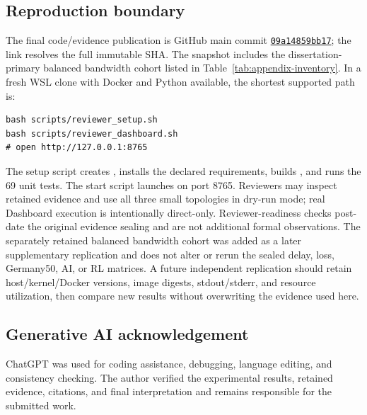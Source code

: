 \subsection{Reproduction boundary}
\label{sec:reviewer-reproduction}

The final code/evidence publication is GitHub main commit \href{https://github.com/Mochi486/Digital-Twin/tree/09a14859bb17e36d892c2145e129128525687229}{\texttt{09a14859bb17}}; the link resolves the full immutable SHA. The snapshot includes the dissertation-primary balanced bandwidth cohort listed in Table~\ref{tab:appendix-inventory}. In a fresh WSL clone with Docker and Python available, the shortest supported path is:

\begin{verbatim}
bash scripts/reviewer_setup.sh
bash scripts/reviewer_dashboard.sh
# open http://127.0.0.1:8765
\end{verbatim}

The setup script creates , installs the declared requirements, builds , and runs the 69 unit tests. The start script launches  on port 8765. Reviewers may inspect retained evidence and use all three small topologies in dry-run mode; real Dashboard execution is intentionally direct-only. Reviewer-readiness checks post-date the original evidence sealing and are not additional formal observations. The separately retained balanced bandwidth cohort was added as a later supplementary replication and does not alter or rerun the sealed delay, loss, Germany50, AI, or RL matrices. A future independent replication should retain host/kernel/Docker versions, image digests, stdout/stderr, and resource utilization, then compare new results without overwriting the evidence used here.

\subsection{Generative AI acknowledgement}

ChatGPT was used for coding assistance, debugging, language editing, and consistency checking. The author verified the experimental results, retained evidence, citations, and final interpretation and remains responsible for the submitted work.
